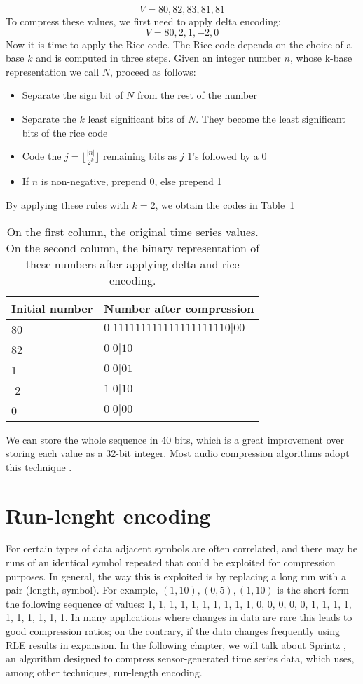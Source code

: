 $$V= 80, 82, 83, 81, 81$$
To compress these values, we first need to apply delta encoding:
$$V = 80, 2, 1, -2, 0$$
Now it is time to apply the Rice code. The Rice code depends on the choice of a base
$k$ and is computed in three steps. Given an integer number $n$, whose k-base representation
we call $N$, proceed as follows:
\begin{itemize}
	\item Separate the sign bit of $N$ from the rest of the number
	\item Separate the $k$ least significant bits of $N$. They become the least significant
    bits of the rice code
	\item Code the $j = \lfloor\frac{|n|}{2^k}\rfloor$ remaining bits as $j$ 1’s followed by a 0
	\item If $n$ is non-negative, prepend 0, else prepend 1
\end{itemize}
By applying these rules with $k = 2$, we obtain the codes in Table~\ref{tab:rice}
\begin{table}[]
\centering
\begin{tabular}{l|l}
\textbf{Initial number}     & \textbf{Number after compression} \\ 
\hline
80          & $0|111111111111111111110|00$ \\                    
82          & $0|0|10$                     \\ 
1           & $0|0|01$                     \\              
-2          & $1|0|10$                     \\           
0           & $0|0|00$                     \\            
\end{tabular}
\caption{On the first column, the original time series values.
On the second column, the binary representation of these numbers after applying delta and rice
encoding.}
\label{tab:rice}
\end{table}
We can store the whole sequence in 40 bits, which is a great improvement over storing each
value as a 32-bit integer. Most audio compression algorithms adopt this technique \cite{WikipediaContributors2019Golomb}.

\section{Run-lenght encoding}
For certain types of data adjacent symbols are often correlated, and there may be runs of an
identical symbol repeated that could be exploited for compression purposes. In general, the way
this is exploited is by replacing a long run with a pair (length, symbol). For example,
$(1, 10), (0, 5), (1, 10)$ is the short form the following sequence of values:
1, 1, 1, 1, 1, 1, 1, 1, 1, 1, 0, 0, 0, 0, 0, 1, 1, 1, 1, 1, 1, 1, 1, 1, 1.
In many applications where changes in data are rare this leads to good compression ratios;
on the contrary, if the data changes frequently using RLE results in expansion. In the
following chapter, we will talk about Sprintz \cite{blalock2018sprintz},
an algorithm designed to compress sensor-generated time series data, which uses, among other
techniques, run-length encoding.

